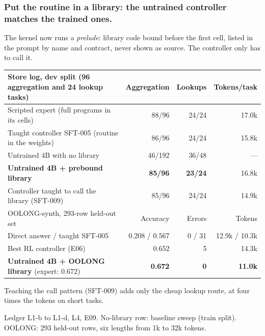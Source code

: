 \documentclass[aspectratio=169,11pt]{beamer}
\newcommand{\source}[1]{\vfill{\scriptsize\color{Gray}#1\par}}
\begin{document}
\begin{frame}[t]
\frametitle{Put the routine in a library: the untrained controller matches the trained ones.}
The kernel now runs a \emph{prelude}: library code bound before the first cell, listed in the
prompt by name and contract, never shown as source. The controller only has to call it.
\begin{center}\footnotesize
\begin{tabular}{@{}lrrr@{}}
\toprule
Store log, dev split (96 aggregation and 24 lookup tasks) & Aggregation & Lookups & Tokens/task \\
\midrule
Scripted expert (full programs in its cells) & 88/96 & 24/24 & 17.0k \\
Taught controller SFT-005 (routine in the weights) & 86/96 & 24/24 & 15.8k \\
Untrained 4B with no library & 46/192 & 36/48 & --- \\
\textbf{Untrained 4B + prebound library} & \textbf{85/96} & \textbf{23/24} & 16.8k \\
Controller taught to call the library (SFT-009) & 85/96 & 24/24 & 14.9k \\
\midrule
OOLONG-synth, 293-row held-out set & Accuracy & Errors & Tokens \\
\midrule
Direct answer / taught SFT-005 & 0.208 / 0.567 & 0 / 31 & 12.9k / 10.3k \\
Best RL controller (E06) & 0.652 & 5 & 14.3k \\
\textbf{Untrained 4B + OOLONG library} (expert: 0.672) & \textbf{0.672} & \textbf{0} & \textbf{11.0k} \\
\bottomrule
\end{tabular}
\end{center}
\small Teaching the call pattern (SFT-009) adds only the cheap lookup route, at four times the tokens on short tasks.
\source{Ledger L1-b to L1-d, L4, E09. No-library row: baseline sweep (train split). OOLONG: 293 held-out rows, six lengths from 1k to 32k tokens.}
\end{frame}
\end{document}
